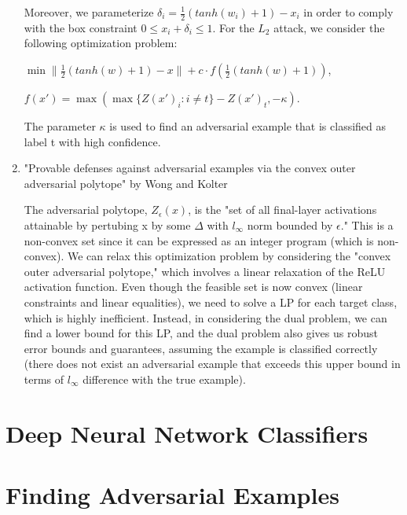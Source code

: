 \documentclass{amsart}
\begin{document}
\begin{enumerate}[label=(\alph*)]
    Moreover, we parameterize $\delta_i = \frac{1}{2} (tanh(w_i) + 1) - x_i$ in order to comply with 
    the box constraint $0 \le x_i + \delta_i \le 1$. For the $L_2$ attack, we consider the following 
    optimization problem:

    $\min \| \frac{1}{2} (tanh(w) + 1) - x\| + c \cdot f(\frac{1}{2} (tanh(w) + 1))$,

    $f(x') = \max(\max\{Z(x')_i : i \neq t\} - Z(x')_t, -\kappa)$.

    The parameter $\kappa$ is used to find an adversarial example that is classified as label t
    with high confidence.

    \item "Provable defenses against adversarial examples via the convex outer adversarial polytope" by Wong
    and Kolter

    The adversarial polytope, $Z_{\epsilon}(x)$, is the "set of all final-layer activations 
    attainable by pertubing x by some $\Delta$ with $l_{\infty}$ norm bounded by $\epsilon$." This 
    is a non-convex set since it can be expressed as an integer program (which is non-convex). 
    We can relax this optimization problem by considering the "convex outer adversarial polytope," 
    which involves a linear relaxation of the ReLU activation function. Even though the feasible set
    is now convex (linear constraints and linear equalities), we need to solve a LP for each target 
    class, which is highly inefficient. Instead, in considering the dual problem, we can find a 
    lower bound for this LP, and the dual problem also gives us robust error bounds and guarantees,
    assuming the example is classified correctly (there does not exist an adversarial example that 
    exceeds this upper bound in terms of $l_{\infty}$ difference with the true example).

\end{enumerate}

\pagebreak

\section{Deep Neural Network Classifiers}



\pagebreak

\section{Finding Adversarial Examples}
\end{document}
